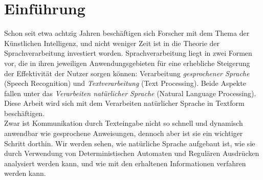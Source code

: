 \documentclass[12pt,twoside]{article}
\theoremstyle{plain}
\theoremstyle{definition}
\theoremstyle{remark}
\begin{document}
\setcounter{tocdepth}{2} 					%
\tableofcontents
{}
\clearpage


\section{Einführung}
\label{sec:intro}
	Schon seit etwa achtzig Jahren beschäftigen sich Forscher mit dem Thema der Künstlichen Intelligenz, und nicht weniger Zeit ist in die Theorie der Sprachverarbeitung investiert worden.
	Sprachverarbeitung liegt in zwei Formen vor, die in ihren jeweiligen Anwendungsgebieten für eine erhebliche Steigerung der Effektivität der Nutzer sorgen können: Verarbeitung \textit{gesprochener Sprache} (Speech Recognition) und \textit{Textverarbeitung} (Text Processing).
	Beide Aspekte fallen unter das \textit{Verarbeiten natürlicher Sprache} (Natural Language Processing).
	Diese Arbeit wird sich mit dem Verarbeiten natürlicher Sprache in Textform beschäftigen.\\
	Zwar ist Kommunikation durch Texteingabe nicht so schnell und dynamisch anwendbar wie gesprochene Anweisungen, dennoch aber ist sie ein wichtiger Schritt dorthin.
	Wir werden sehen, wie natürliche Sprache aufgebaut ist, wie sie durch Verwendung von Deterministischen Automaten und Regulären Ausdrücken analysiert werden kann, und wie mit den erhaltenen Informationen verfahren werden kann.
\end{document}

